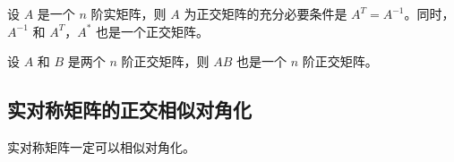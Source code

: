 \documentclass[a4paper,12pt]{ctexart}
\begin{document}
\begin{mythm}{}{}
    设 $A$ 是一个 $n$ 阶实矩阵，则 $A$ 为正交矩阵的充分必要条件是 $A^T = A^{ -1}$。同时，$A^{-1}$ 和 $A^T$，$A^*$ 也是一个正交矩阵。
\end{mythm}

\begin{mythm}{}{}
    设 $A$ 和 $B$ 是两个 $n$ 阶正交矩阵，则 $AB$ 也是一个 $n$ 阶正交矩阵。
\end{mythm}

\subsection{实对称矩阵的正交相似对角化}

\begin{mythm}{}{}
    实对称矩阵一定可以相似对角化。
\end{mythm}
\end{document}
